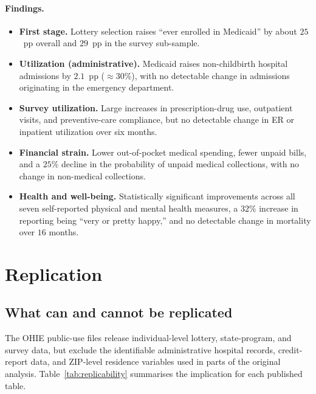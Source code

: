 \documentclass[11pt]{article}
\begin{document}
\paragraph{Findings.}
\begin{itemize}[leftmargin=*,itemsep=2pt]
  \item \textbf{First stage.} Lottery selection raises ``ever enrolled
  in Medicaid'' by about $25$~pp overall and $29$~pp in the survey
  sub-sample.
  \item \textbf{Utilization (administrative).} Medicaid raises
  non-childbirth hospital admissions by $2.1$~pp ($\approx\!30\%$),
  with no detectable change in admissions originating in the emergency
  department.
  \item \textbf{Survey utilization.} Large increases in
  prescription-drug use, outpatient visits, and preventive-care
  compliance, but no detectable change in ER or inpatient utilization
  over six months.
  \item \textbf{Financial strain.} Lower out-of-pocket medical
  spending, fewer unpaid bills, and a $25\%$ decline in the probability
  of unpaid medical collections, with no change in non-medical
  collections.
  \item \textbf{Health and well-being.} Statistically significant
  improvements across all seven self-reported physical and mental
  health measures, a $32\%$ increase in reporting being ``very or
  pretty happy,'' and no detectable change in mortality over $16$
  months.
\end{itemize}

\section{Replication}

\subsection{What can and cannot be replicated}

The OHIE public-use files release individual-level lottery,
state-program, and survey data, but exclude the identifiable
administrative hospital records, credit-report data, and ZIP-level
residence variables used in parts of the original analysis.
Table~\ref{tab:replicability} summarises the implication for each
published table.
\end{document}
